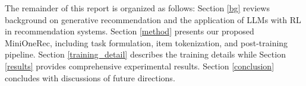 The remainder of this report is organized as follows:
Section \ref{bg} reviews background on generative recommendation and the application of LLMs with RL in recommendation systems.
Section \ref{method} presents our proposed MiniOneRec, including task formulation, item tokenization, and post-training pipeline.
Section \ref{training_detail} describes the training details while Section \ref{results} provides comprehensive experimental results.
Section \ref{conclusion} concludes with discussions of future directions.